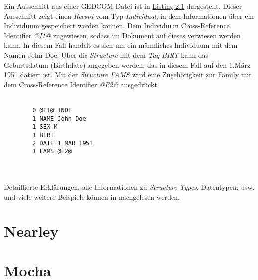 Ein Ausschnitt aus einer GEDCOM-Datei ist in \hyperref[lst: individual record example]{Listing 2.1} dargestellt. Dieser Ausschnitt zeigt einen \textit{Record} vom Typ \textit{Individual}, in dem Informationen über ein Individuum gespeichert werden können. Dem Individuum Cross-Reference Identifier \textit{@I1@} zugewiesen, sodass im Dokument auf dieses verwiesen werden kann. In diesem Fall handelt es sich um ein männliches Individuum mit dem Namen John Doe. Über die \textit{Structure} mit dem \textit{Tag BIRT} kann das Geburtsdatum (Birthdate) angegeben werden, das in diesem Fall auf den 1.März 1951 datiert ist. Mit der \textit{Structure FAMS} wird eine Zugehörigkeit zur Family mit dem Cross-Reference Identifier \textit{@F2@} ausgedrückt.
\\ \\
\begin{minipage}{1.0\textwidth} \small
	\begin{lstlisting}
		0 @I1@ INDI
		1 NAME John Doe
		1 SEX M
		1 BIRT
		2 DATE 1 MAR 1951
		1 FAMS @F2@
	\end{lstlisting}
	\label{lst: individual record example}
\end{minipage}
\\ \\
Detaillierte Erklärungen, alle Informationen zu \textit{Structure Types}, Datentypen, usw. und viele weitere Beispiele können in \cite{GEDCOM} nachgelesen werden.


\section{Nearley}
\label{sec: Nearley}

\section{Mocha}
\label{sec: Mocha}